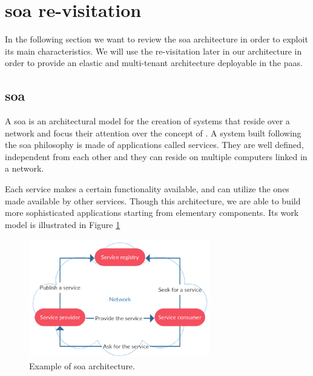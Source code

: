 %
%
\section{\acs{soa} re-visitation}
\label{sec:architecture-soaRevisitation}
In the following section we want to review the \ac{soa} architecture in order to exploit its main
characteristics. We will use the re-visitation later in our architecture in order to provide an
elastic and multi-tenant architecture deployable in the \ac{paas}.

\subsection{\acf{soa}}
A \acf{soa} is an architectural model for the creation of systems that reside over a network and
focus their attention over the concept of . A system built following the \ac{soa}
philosophy is made of applications called services. They are well defined, independent from each
other and they can reside on multiple computers linked in a network.

Each service makes a certain functionality available, and can utilize the ones made available by other
services. Though this architecture, we are able to build more sophisticated applications starting from
elementary components. Its work model is illustrated in Figure \ref{img:architecture-soaRevisitation-workmodel}

\begin{figure}
	\centering{}
	\includegraphics[width=0.7\textwidth]{chapters/architecture/images/soa-workmodel.png}
	\caption[Example of \acs{soa} architecture]{Example of \acf{soa} architecture.}
	\label{img:architecture-soaRevisitation-workmodel}
\end{figure} 

